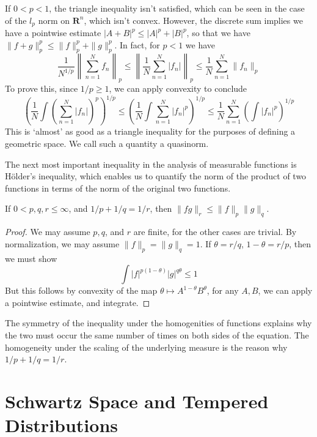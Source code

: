 If $0 < p < 1$, the triangle inequality isn't satisfied, which can be seen in the case of the $l_p$ norm on $\mathbf{R}^n$, which isn't convex. However, the discrete sum implies we have a pointwise estimate $|A + B|^p \leq |A|^p + |B|^p$, so that we have $\| f + g \|_p^p \leq \| f \|_p^p + \| g \|_p^p$. In fact, for $p < 1$ we have
%
\[ \frac{1}{N^{1/p}} \left\| \sum_{n = 1}^N f_n \right\|_p \leq \left\| \frac{1}{N} \sum_{n = 1}^N |f_n| \right\|_p \leq \frac{1}{N} \sum_{n = 1}^N \| f_n \|_p \]
%
To prove this, since $1/p \geq 1$, we can apply convexity to conclude
%
\[ \left( \frac{1}{N} \int \left( \sum_{n = 1}^N |f_n| \right)^p \right)^{1/p} \leq \left( \frac{1}{N} \int \sum_{n = 1}^N |f_n|^p \right)^{1/p} \leq \frac{1}{N} \sum_{n = 1}^N \left( \int |f_n|^p \right)^{1/p} \]
%
This is `almost' as good as a triangle inequality for the purposes of defining a geometric space. We call such a quantity a quasinorm.

The next most important inequality in the analysis of measurable functions is H\"{o}lder's inequality, which enables us to quantify the norm of the product of two functions in terms of the norm of the original two functions.

\begin{theorem}
  If $0 < p,q,r \leq \infty$, and $1/p + 1/q = 1/r$, then $\| fg \|_r \leq \| f \|_p \| g \|_q$.
\end{theorem}
\begin{proof}
  We may assume $p,q$, and $r$ are finite, for the other cases are trivial. By normalization, we may assume $\| f \|_p = \| g \|_q = 1$. If $\theta = r/q$, $1 - \theta = r/p$, then we must show
  \[ \int |f|^{p(1 - \theta)} |g|^{q\theta} \leq 1 \]
  But this follows by convexity of the map $\theta \mapsto A^{1 - \theta} B^\theta$, for any $A,B$, we can apply a pointwise estimate, and integrate.
\end{proof}

\begin{remark}
  The symmetry of the inequality under the homogenities of functions explains why the two must occur the same number of times on both sides of the equation. The homogeneity under the scaling of the underlying measure is the reason why $1/p + 1/q = 1/r$.
\end{remark}







\chapter{Schwartz Space and Tempered Distributions}

